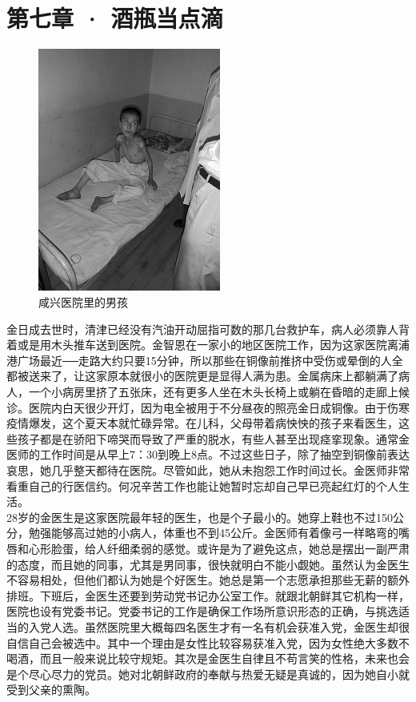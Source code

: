 \fancyhead[RO]{\thepage}
\fancyhead[LE]{\thepage}
\fancyfoot[LE,RO]{}
\fancyfoot[LO,CE]{}
\fancyfoot[CO,RE]{}
\chapter*{第七章 · 酒瓶当点滴}
\begin{figure}[!htbp]
	\centering
	\includegraphics[width=6cm]{./Chapters/Images/07.jpg}
	\caption*{咸兴医院里的男孩}
\end{figure}


金日成去世时，清津已经没有汽油开动屈指可数的那几台救护车，病人必须靠人背着或是用木头推车送到医院。金智恩在一家小的地区医院工作，因为这家医院离浦港广场最近──走路大约只要15分钟，所以那些在铜像前推挤中受伤或晕倒的人全都被送来了，让这家原本就很小的医院更是显得人满为患。金属病床上都躺满了病人，一个小病房里挤了五张床，还有更多人坐在木头长椅上或躺在昏暗的走廊上候诊。医院内白天很少开灯，因为电全被用于不分昼夜的照亮金日成铜像。由于伤寒疫情爆发，这个夏天本就忙碌异常。在儿科，父母带着病怏怏的孩子来看医生，这些孩子都是在骄阳下啼哭而导致了严重的脱水，有些人甚至出现痉挛现象。通常金医师的工作时间是从早上7：30到晚上8点。不过这些日子，除了抽空到铜像前表达哀思，她几乎整天都待在医院。尽管如此，她从未抱怨工作时间过长。金医师非常看重自己的行医信约。何况辛苦工作也能让她暂时忘却自己早已亮起红灯的个人生活。\\

28岁的金医生是这家医院最年轻的医生，也是个子最小的。她穿上鞋也不过150公分，勉强能够高过她的小病人，体重也不到45公斤。金医师有着像弓一样略弯的嘴唇和心形脸蛋，给人纤细柔弱的感觉。或许是为了避免这点，她总是摆出一副严肃的态度，而且她的同事，尤其是男同事，很快就明白不能小觑她。虽然认为金医生不容易相处，但他们都认为她是个好医生。她总是第一个志愿承担那些无薪的额外排班。下班后，金医生还要到劳动党书记办公室工作。就跟北朝鲜其它机构一样，医院也设有党委书记。党委书记的工作是确保工作场所意识形态的正确，与挑选适当的入党人选。虽然医院里大概每四名医生才有一名有机会获准入党，金医生却很自信自己会被选中。其中一个理由是女性比较容易获准入党，因为女性绝大多数不喝酒，而且一般来说比较守规矩。其次是金医生自律且不苟言笑的性格，未来也会是个尽心尽力的党员。她对北朝鲜政府的奉献与热爱无疑是真诚的，因为她自小就受到父亲的熏陶。\\

